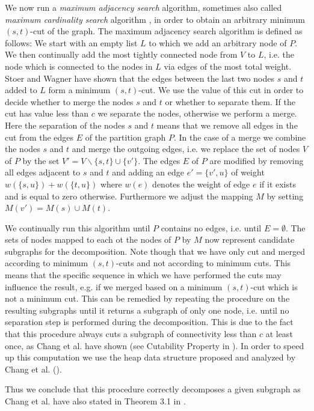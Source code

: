 \documentclass[a4paper,UKenglish,cleveref, autoref, thm-restate,authorcolumns]{lipics-v2019}
\begin{document}
We now run a \textit{maximum adjacency search} algorithm, sometimes also called \textit{maximum cardinality search} algorithm \cite{Stoer1997}, in order to obtain an arbitrary minimum $(s,t)$-cut of the graph.
The maximum adjacency search algorithm is defined as follows: We start with an empty list $L$ to which we add an arbitrary node of $P$. We then continually add the most tightly connected node from $V$ to $L$, i.e. the node which is connected to the nodes in $L$ via edges of the most total weight. Stoer and Wagner \cite{Stoer1997} have shown that the edges between the last two nodes $s$ and $t$ added to $L$ form a minimum $(s,t)$-cut.
We use the value of this cut in order to decide whether to merge the nodes $s$ and $t$ or whether to separate them. If the cut has value less than $c$ we separate the nodes, otherwise we perform a merge.
Here the separation of the nodes $s$ and $t$ means that we remove all edges in the cut from the edges $E$ of the partition graph $P$.
In the case of a merge we combine the nodes $s$ and $t$ and merge the outgoing edges, i.e. we replace the set of nodes $V$ of $P$ by the set $V'=V\backslash\{s,t\}\cup\{v'\}$. The edges $E$ of $P$ are modified by removing all edges adjacent to $s$ and $t$ and adding an edge $e'=\{v',u\}$ of weight $w(\{s,u\})+w(\{t,u\})$ where $w(e)$ denotes the weight of edge $e$ if it exists and is equal to zero otherwise.
Furthermore we adjust the mapping $M$ by setting $M(v')=M(s)\cup M(t)$.

We continually run this algorithm until $P$ contains no edges, i.e. until $E=\emptyset$. The sets of nodes mapped to each ot the nodes of $P$ by $M$ now represent candidate subgraphs for the decomposition. Note though that we have only cut and merged according to minimum $(s,t)$-cuts and not according to minimum cuts. This means that the specific sequence in which we have performed the cuts may influence the result, e.g. if we merged based on a minimum $(s,t)$-cut which is not a minimum cut.
This can be remedied by repeating the procedure on the resulting subgraphs until it returns a subgraph of only one node, i.e. until no separation step is performed during the decomposition. This is due to the fact that this procedure always cuts a subgraph of connectivity less than $c$ at least once, as Chang et al. have shown (see Cutability Property in \cite{Chang2013}).
In order to speed up this computation we use the heap data structure proposed and analyzed by Chang et al. (\cite{Chang2013}).

Thus we conclude that this procedure correctly decomposes a given subgraph as Chang et al. have also stated in Theorem 3.1 in \cite{Chang2013}.
\end{document}
